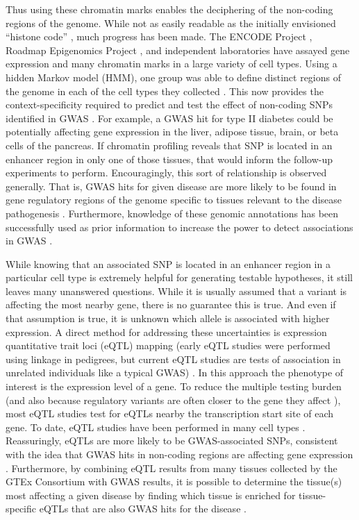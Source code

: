 Thus using these chromatin marks enables the deciphering of the
non-coding regions of the genome. While not as easily readable as the initially
envisioned ``histone code'' \citep{Jenuwein2001}, much progress has been
made. The ENCODE Project \citep{ENCODE2004, ENCODE2007, ENCODE2012, Ho2014, Kellis2014},
Roadmap Epigenomics Project \citep{Roadmap2015}, and independent laboratories
\citep{Mikkelsen2007} have assayed gene expression and many
chromatin marks in a large variety of cell types. Using a hidden
Markov model (HMM), one group was able to define distinct regions of the
genome in each of the cell types they collected \citep{Ernst2011}. This now provides the
context-specificity required to predict and test the effect of
non-coding SNPs identified in GWAS \citep{Trynka2013}. For example, a GWAS hit for type
II diabetes could be potentially affecting gene expression in the
liver, adipose tissue, brain, or beta cells of the pancreas. If
chromatin profiling reveals that SNP is located in an enhancer region
in only one of those tissues, that would inform the follow-up
experiments to perform. Encouragingly, this sort of relationship is
observed generally. That is, GWAS hits for given disease are more
likely to be found in gene regulatory regions of the genome specific
to tissues relevant to the disease pathogenesis \citep{Ernst2011, Trynka2013, Farh2015, Roadmap2015}. Furthermore,
knowledge of these genomic annotations has been successfully used as
prior information to increase the power to detect associations in
GWAS \citep{Pickrell2014, Wang2016}.

While knowing that an associated SNP is located in an enhancer region
in a particular cell type is extremely helpful for generating testable
hypotheses, it still leaves many unanswered questions. While it is
usually assumed that a variant is affecting the most nearby gene,
there is no guarantee this is true. And even if that assumption is
true, it is unknown which allele is associated with higher
expression. A direct method for addressing these uncertainties is
expression quantitative trait loci (eQTL) mapping
(early eQTL studies were performed using linkage in
pedigrees, but current eQTL studies are tests of association in
unrelated individuals like a typical GWAS) \citep{Monks2004, Duan2008, Franke2009, Lappalainen2015, Pai2015}. In this approach the
phenotype of interest is the expression level of a gene. To reduce the
multiple testing burden (and also because regulatory variants are
often closer to the gene they affect \citep{Battle2014}), most eQTL studies test for
eQTLs nearby the transcription start site of each gene. To date, eQTL
studies have been performed in many cell types \citep{Nica2011, GTEx2015}. Reassuringly, eQTLs
are more likely to be GWAS-associated SNPs, consistent with the idea
that GWAS hits in non-coding regions are affecting gene
expression \citep{Emilsson2008, Nica2010, Nicolae2010, Raj2013, GTEx2015}. Furthermore, by combining eQTL results from many tissues
collected by the GTEx Consortium \citep{GTEx2013} with GWAS results, it is possible to
determine the tissue(s) most affecting a given disease by finding
which tissue is enriched for tissue-specific eQTLs that are also GWAS
hits for the disease \citep{Ongen2016}.

